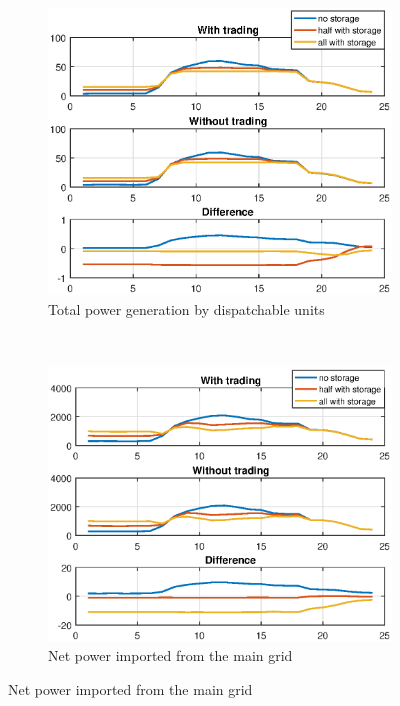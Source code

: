 \documentclass[10pt]{article}
\newtheorem{definitiox	n}{Definition}{\it}{}
\newcommand{\0}{\mathbf{0}}
\newcommand{\1}{\mathbf{1}}
\begin{document}
\begin{figure}[h]
	\centering
	\begin{subfigure}{0.5\textwidth}
		\centering
		\includegraphics[width=1\linewidth]{pdi.eps}
		\caption{Total power generation by dispatchable units}
	\end{subfigure}%
	~ 
	\begin{subfigure}{0.5\textwidth}
		\centering
		\includegraphics[width=1\linewidth]{pmg.eps}
		\caption{Net power imported from the main grid}
	\end{subfigure}
\end{figure}
\end{document}
